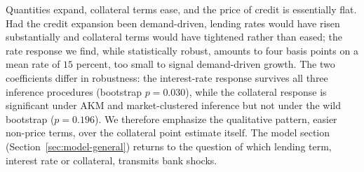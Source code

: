 \documentclass[12pt]{article}
\begin{document}
\begin{table}[H]
    \caption{Shift-Share IV estimates of the effect of bank shocks on the number of firms with credit}
    \label{main_credit_table}
    \centering
    \small
    
\end{table}

\begin{table}[H]
    \caption{Decomposition of the credit response: extensive and intensive margins}
    \label{loan_decomp}
    \centering
    \small
    
\end{table}

Quantities expand, collateral terms ease, and the price of credit is essentially flat. Had the credit expansion been demand-driven, lending rates would have risen substantially and collateral terms would have tightened rather than eased; the rate response we find, while statistically robust, amounts to four basis points on a mean rate of $15$ percent, too small to signal demand-driven growth. The two coefficients differ in robustness: the interest-rate response survives all three inference procedures (bootstrap $p=0.030$), while the collateral response is significant under AKM and market-clustered inference but not under the wild bootstrap ($p=0.196$). We therefore emphasize the qualitative pattern, easier non-price terms, over the collateral point estimate itself. The model section (Section~\ref{sec:model-general}) returns to the question of which lending term, interest rate or collateral, transmits bank shocks.

\begin{table}[H]
    \caption{Shift-Share IV estimates of the effect of bank shocks on interest rate and collateral}
    \label{rate_and_collateral}
    \centering
    \small
    
\end{table}
\end{document}

